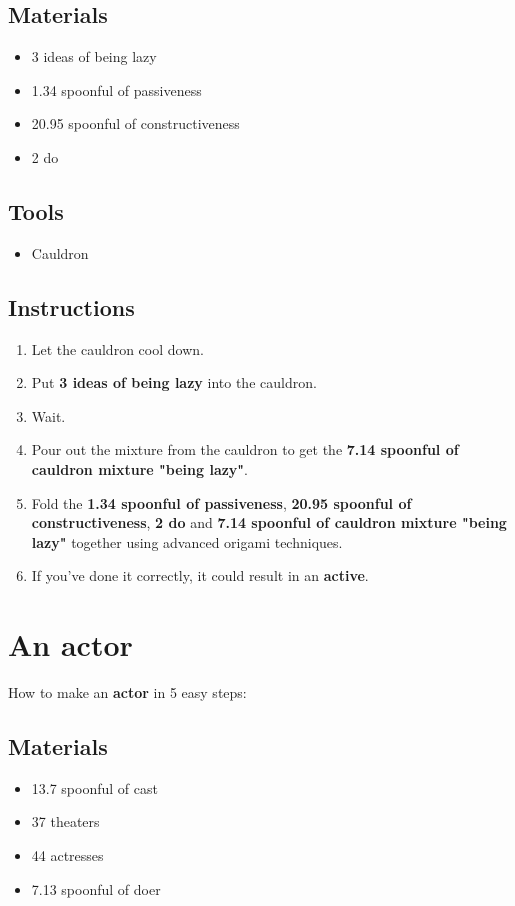 \documentclass{article}
\begin{document}
\subsection{Materials}\begin{itemize}
\item 
3 ideas of being lazy
\item 
1.34 spoonful of passiveness
\item 
20.95 spoonful of constructiveness
\item 
2 do
\end{itemize}
\subsection{Tools}\begin{itemize}
\item 
Cauldron
\end{itemize}
\subsection{Instructions}\begin{enumerate}
\item 
Let the cauldron cool down.
\item 
Put \textbf{3 ideas of being lazy} into the cauldron.
\item 
Wait.
\item 
Pour out the mixture from the cauldron to get the \textbf{7.14 spoonful of cauldron mixture "being lazy"}.
\item 
Fold the \textbf{1.34 spoonful of passiveness}, \textbf{20.95 spoonful of constructiveness}, \textbf{2 do} and \textbf{7.14 spoonful of cauldron mixture "being lazy"} together using advanced origami techniques.
\item 
If you've done it correctly, it could result in an \textbf{active}.
\end{enumerate}
\newpage
\section{An actor}How to make an \textbf{actor} in 5 easy steps:

\subsection{Materials}\begin{itemize}
\item 
13.7 spoonful of cast
\item 
37 theaters
\item 
44 actresses
\item 
7.13 spoonful of doer
\end{itemize}
\end{document}

